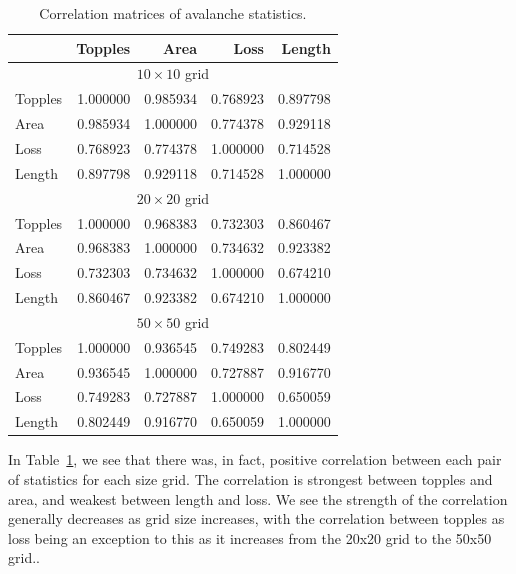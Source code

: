 \begin{table}[htbp]
    \centering
    \caption{Correlation matrices of avalanche statistics.}
    \label{tab:corr}
    \begin{tabular}{lrrrr}
        \toprule
         & Topples & Area & Loss & Length \\
        \midrule
        \multicolumn{5}{c}{$10 \times 10$ grid} \\
        \midrule
        Topples & 1.000000 & 0.985934 & 0.768923 & 0.897798 \\
        Area    & 0.985934 & 1.000000 & 0.774378 & 0.929118 \\
        Loss    & 0.768923 & 0.774378 & 1.000000 & 0.714528 \\
        Length  & 0.897798 & 0.929118 & 0.714528 & 1.000000 \\
        \midrule
        \multicolumn{5}{c}{$20 \times 20$ grid} \\
        \midrule
        Topples & 1.000000 & 0.968383 & 0.732303 & 0.860467 \\
        Area    & 0.968383 & 1.000000 & 0.734632 & 0.923382 \\
        Loss    & 0.732303 & 0.734632 & 1.000000 & 0.674210 \\
        Length  & 0.860467 & 0.923382 & 0.674210 & 1.000000 \\
        \midrule
        \multicolumn{5}{c}{$50 \times 50$ grid} \\
        \midrule
        Topples & 1.000000 & 0.936545 & 0.749283 & 0.802449 \\
        Area    & 0.936545 & 1.000000 & 0.727887 & 0.916770 \\
        Loss    & 0.749283 & 0.727887 & 1.000000 & 0.650059 \\
        Length  & 0.802449 & 0.916770 & 0.650059 & 1.000000 \\
        \bottomrule
    \end{tabular}
\end{table}


In Table~\ref{tab:corr}, we see that there was, in fact, positive correlation between each pair of statistics for each size grid. The correlation is strongest between topples and area, and weakest between length and loss. We see the strength of the correlation generally decreases as grid size increases, with the correlation between topples as loss being an exception to this as it increases from the 20x20 grid to the 50x50 grid..



